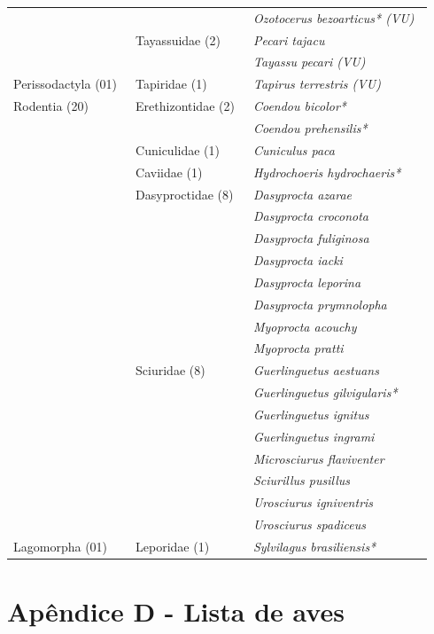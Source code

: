 \documentclass[
  letterpaper,
]{scrbook}
\begin{document}
\begin{longtable}[t]{ll>{}l}
 &  & \em{Ozotocerus bezoarticus* (VU) }\\
 & Tayassuidae (2)  & \em{Pecari tajacu }\\
 &  & \em{Tayassu pecari (VU) }\\
\addlinespace
Perissodactyla (01)  & Tapiridae (1)  & \em{Tapirus terrestris (VU) }\\
Rodentia (20)  & Erethizontidae (2)  & \em{Coendou bicolor* }\\
 &  & \em{Coendou prehensilis* }\\
 & Cuniculidae (1)  & \em{Cuniculus paca }\\
 & Caviidae (1)  & \em{Hydrochoeris hydrochaeris* }\\
\addlinespace
 & Dasyproctidae (8)  & \em{Dasyprocta azarae }\\
 &  & \em{Dasyprocta croconota }\\
 &  & \em{Dasyprocta fuliginosa }\\
 &  & \em{Dasyprocta iacki }\\
 &  & \em{Dasyprocta leporina }\\
\addlinespace
 &  & \em{Dasyprocta prymnolopha }\\
 &  & \em{Myoprocta acouchy }\\
 &  & \em{Myoprocta pratti }\\
 & Sciuridae (8)  & \em{Guerlinguetus aestuans }\\
 &  & \em{Guerlinguetus gilvigularis* }\\
\addlinespace
 &  & \em{Guerlinguetus ignitus }\\
 &  & \em{Guerlinguetus ingrami }\\
 &  & \em{Microsciurus flaviventer }\\
 &  & \em{Sciurillus pusillus }\\
 &  & \em{Urosciurus igniventris }\\
\addlinespace
 &  & \em{Urosciurus spadiceus }\\
Lagomorpha (01)  & Leporidae (1)  & \em{Sylvilagus brasiliensis* }\\*

\end{longtable}

\section*{Apêndice D - Lista de
aves}\label{apuxeandice-d---lista-de-aves}
\end{document}

